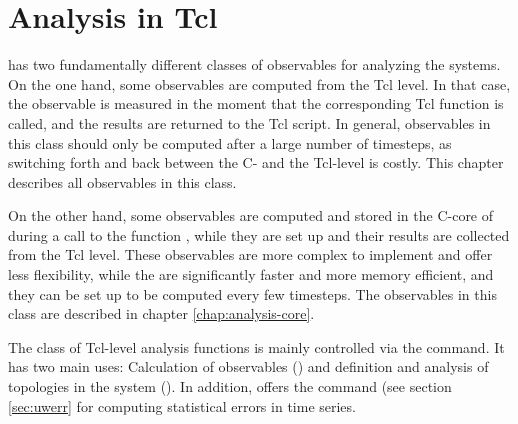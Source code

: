%  
%   
%  
%  
%
\chapter{Analysis in Tcl}
\label{chap:analysis}

\es has two fundamentally different classes of observables for
analyzing the systems.  On the one hand, some observables are
computed from the Tcl level. In that case, the observable is measured
in the moment that the corresponding Tcl function is called, and the
results are returned to the Tcl script. In general, observables in
this class should only be computed after a large number of timesteps,
as switching forth and back between the C- and the Tcl-level is
costly. This chapter describes all observables in this class.

On the other hand, some observables are computed and stored in the
C-core of \es during a call to the function , while
they are set up and their results are collected from the Tcl level.
These observables are more complex to implement and offer less
flexibility, while the are significantly faster and more memory
efficient, and they can be set up to be computed every few
timesteps. The observables in this class are described in chapter
\ref{chap:analysis-core}.

The class of Tcl-level analysis functions is mainly controlled via the
 command. It has two main uses: Calculation of
observables () and definition and
analysis of topologies in the system ().  In addition, \es offers the command 
(see section \ref{sec:uwerr} for computing statistical errors in time
series.

